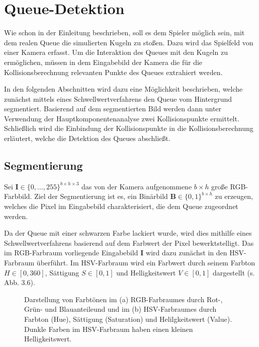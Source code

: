 \section{Queue-Detektion}

Wie schon in der Einleitung beschrieben, soll es dem Spieler möglich sein, mit dem realen Queue die simulierten Kugeln zu stoßen.
Dazu wird das Spielfeld von einer Kamera erfasst. 
Um die Interaktion des Queues mit den Kugeln zu ermöglichen, müssen in dem Eingabebild der Kamera die für die Kollisionsberechnung relevanten Punkte des Queues extrahiert werden.

In den folgenden Abschnitten wird dazu eine Möglichkeit beschrieben, welche zunächst mittels eines Schwellwertverfahrens den Queue vom Hintergrund segmentiert.
Basierend auf dem segmentierten Bild werden dann unter Verwendung der Hauptkomponentenanalyse zwei Kollisionspunkte ermittelt.
Schließlich wird die Einbindung der Kollisionspunkte in die Kollisionsberechnung erläutert, welche die Detektion des Queues abschließt.

\subsection{Segmentierung}
Sei $\textbf{I} \in \{0, \dots, 255\}^{b \times h \times 3}$ das von der Kamera aufgenommene $b \times h$ große RGB-Farbbild.
Ziel der Segmentierung ist es, ein Binärbild $\textbf{B} \in \{0,1\}^{b \times h}$ zu erzeugen, welches die Pixel im Eingabebild charakterisiert, die dem Queue zugeordnet werden.

Da der Queue mit einer schwarzen Farbe lackiert wurde, wird dies mithilfe eines Schwellwertverfahrens basierend auf dem Farbwert der Pixel bewerktstelligt.
Das im RGB-Farbraum vorliegende Eingabebild $\textbf{I}$ wird dazu zunächst in den HSV-Farbraum überführt. 
Im HSV-Farbraum wird ein Farbwert durch seinem Farbton $H \in [0, 360]$, Sättigung $S \in [0, 1]$ und Helligkeitswert $V \in [0, 1]$ dargestellt (s. Abb. 3.6).

\begin{figure}[H]
	\label{fig:HSVRGB}
	\centering
	\caption{Darstellung von Farbtönen im (a) RGB-Farbraumes durch Rot-, Grün- und Blauanteileund und  im (b) HSV-Farbraumes durch Farbton (Hue), Sättigung (Saturation) und Helilgkeitswert (Value). Dunkle Farben im HSV-Farbraum haben einen kleinen Helligkeitswert.}
\end{figure}

